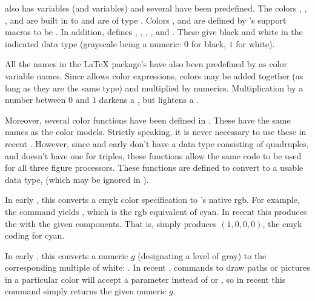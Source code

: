 \documentclass[letterpaper]{article}
\begin{document}
\CMP{} also has  variables (and  variables) and
several have been predefined. The colors , ,
,  and  are built in to \MP{} and are of
type . Colors ,  and 
are defined by \mfp{}'s \MP{} support macros to be . In
addition, \mfp{} defines , ,
, ,  and .
These give black and white in the indicated data type (grayscale being a
numeric: $0$ for black, $1$ for white).

All the names in the \LaTeX{}  package's 
have also been predefined by \mfp{} as color variable names. Since \MP{}
allows color expressions, colors may be added together (as long as they
are the same type) and multiplied by numerics. Multiplication by a
number between $0$ and $1$ darkens a , but lightens a
.

Moreover, several \MP{} color functions have been defined in
. These have the same names as the color models.
Strictly speaking, it is never necessary to use these in recent \MP{}.
However, since \MF{} and early \MP{} don't have a data type consisting
of quadruples, and \MF{} doesn't have one for triples, these functions
allow the same \mfp{} code to be used for all three figure processors.
These functions are defined to convert to a usable data type, (which may
be ignored in \MF{}).

\begin{cd}
%
\end{cd}

In early \MP{}, this converts a cmyk color specification to \MP{}'s
native rgb. For example, the command  yields
, which is the rgb equivalent of cyan. In recent \MP{} this
produces the  with the given components. That is,
 simply produces $(1,0,0,0)$, the cmyk coding for
cyan.

\begin{cd}
%
\end{cd}

In early \MP{}, this converts a numeric $g$ (designating a level of
gray) to the corresponding multiple of white: . In
recent \MP{}, commands to draw paths or pictures in a particular color
will accept a  parameter instead of  or
, so in recent \MP{} this command simply returns the given
numeric $g$.
\end{document}
